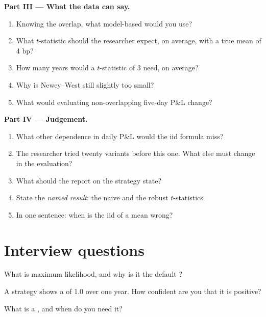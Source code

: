 \begin{problem}
\medskip\noindent\textbf{Part III --- What the data can say.}
\begin{enumerate}[resume]
\item Knowing the overlap, what model-based  would you use?
\item What $t$-statistic should the researcher expect, on average, with a true mean of 4 bp?
\item How many years would a $t$-statistic of 3 need, on average?
\item Why is Newey--West still slightly too small?
\item What would evaluating non-overlapping five-day P\&L change?
\end{enumerate}

\medskip\noindent\textbf{Part IV --- Judgement.}
\begin{enumerate}[resume]
\item What other dependence in daily P\&L would the iid formula miss?
\item The researcher tried twenty variants before this one. What else must change in the evaluation?
\item What should the report on the strategy state?
\item State the \emph{named result}: the naive and the robust $t$-statistics.
\item In one sentence: when is the iid  of a mean wrong?
\end{enumerate}
\end{problem}

\section{Interview questions}

\begin{interviewq}\label{iq:qm:estimation:1}
What is maximum likelihood, and why is it the default ?
\end{interviewq}

\begin{interviewq}\label{iq:qm:estimation:2}
A strategy shows a  of 1.0 over one year. How confident are you that it is positive?
\end{interviewq}

\begin{interviewq}\label{iq:qm:estimation:3}
What is a , and when do you need it?
\end{interviewq}

